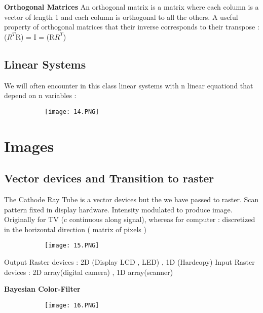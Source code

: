 \documentclass{article}
\begin{document}
\vspace{3mm}
\textbf{Orthogonal Matrices}
\vspace{3mm}
An orthogonal matrix is a matrix where each column is a vector of length 1 and each column is orthogonal to all the others. A useful property of orthogonal matrices that their inverse corresponds to their transpose :($R^T$R) = I = (R$R^T$)

\subsection{Linear Systems}
We will often encounter in this class linear systems with n linear equationd that depend on n variables : 

\begin{figure}[ht!]
  \centering
  \begin{subfigure}[b]{0.8\linewidth}
    \texttt{[image: 14.PNG]}
  \end{subfigure}
\end{figure}

\section{Images}
\subsection{Vector devices and Transition to raster}
The Cathode Ray Tube is a vector devices but the we have passed to raster. 
Scan pattern fixed in display hardware. Intensity modulated to produce image. Originally for TV (c continuous along signal), whereas for computer : discretized in the horizontal direction ( matrix of pixels )

\begin{figure}[ht!]
  \centering
  \begin{subfigure}[b]{0.3\linewidth}
    \texttt{[image: 15.PNG]}
  \end{subfigure}
\end{figure}

Output Raster devices : 2D (Display LCD , LED) , 1D (Hardcopy)
Input Raster  devices : 2D array(digital camera) , 1D array(scanner)

\vspace{3mm}
\textbf{Bayesian Color-Filter}

\begin{figure}[ht!]
  \centering
  \begin{subfigure}[b]{0.3\linewidth}
    \texttt{[image: 16.PNG]}
  \end{subfigure}
\end{figure}
\end{document}
